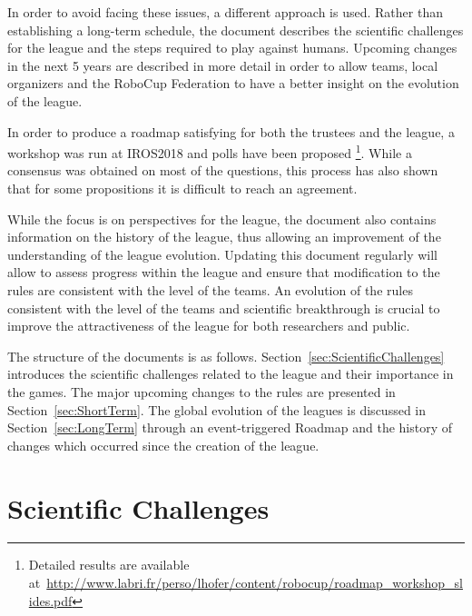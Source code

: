 \documentclass{article}
\newcommand{\added}[1]{{\color{magenta}{#1}}}
\begin{document}
In order to avoid facing these issues, a different approach is used. Rather than
establishing a long-term schedule, the document describes the scientific challenges
for the league and the steps required to play against humans.
Upcoming changes in the next 5 years are described in more detail in order to allow
teams, local organizers and the RoboCup Federation to have a better insight on
the evolution of the league.

In order to produce a roadmap satisfying for both the trustees and the league,
a workshop was run at IROS2018 and polls have been proposed%
\footnote{Detailed results are available at~\url{http://www.labri.fr/perso/lhofer/content/robocup/roadmap_workshop_slides.pdf}}.
While a consensus was obtained on most of the questions,
this process has also shown that for some propositions it is difficult to reach an agreement.

While the focus is on perspectives for the league,
the document also contains information on the history of the league,
thus allowing an improvement of the understanding of the league evolution.
Updating this document regularly will allow to assess progress within the league
and ensure that modification to the rules are consistent with the level of the
teams.
An evolution of the rules consistent with the level of the teams and
scientific breakthrough is crucial to improve the attractiveness of the league
for both researchers and public.

The structure of the documents is as
follows. Section~\ref{sec:ScientificChallenges} introduces the scientific
challenges related to the league and their importance in the games. The major
upcoming changes to the rules are presented in Section~\ref{sec:ShortTerm}. The
global evolution of the leagues is discussed in Section~\ref{sec:LongTerm}
through an event-triggered Roadmap and the history of changes which occurred
since the creation of the league.

\added{
  The original document from 2019 has been updated in:
  \begin{description}
  \item[2020:] Update of short-term: upcoming changes
  \end{description}
}


\section{\label{sec:ScientificChallenges}Scientific Challenges}
\end{document}
